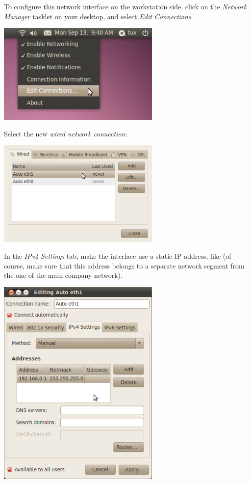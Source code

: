 To configure this network interface on the workstation side, click on
the {\em Network Manager} tasklet on your desktop, and select {\em
  Edit Connections}.

\begin{center}
\includegraphics[width=8cm]{labs/sysdev-u-boot/network-config-1.png}
\end{center}

Select the new {\em wired network connection}:

\begin{center}
\includegraphics[width=8cm]{labs/sysdev-u-boot/network-config-2.png}
\end{center}

In the {\em IPv4 Settings} tab, make the interface use a static IP
address, like  (of course, make sure that this
address belongs to a separate network segment from the one of the main
company network).

\begin{center}
\includegraphics[width=8cm]{labs/sysdev-u-boot/network-config-3.png}
\end{center}


